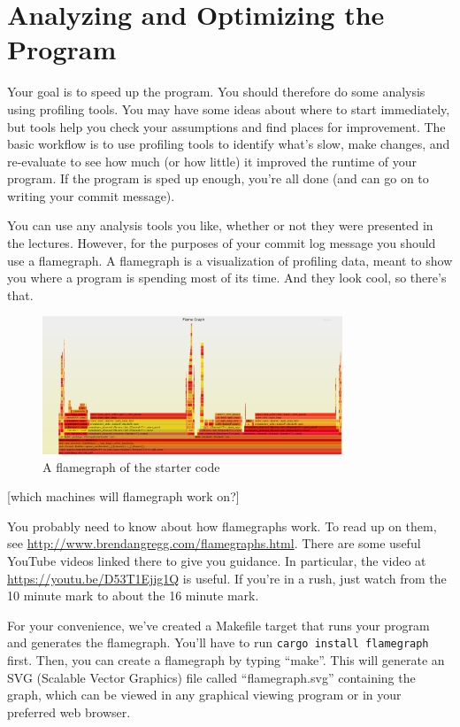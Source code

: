 \section*{Analyzing and Optimizing the Program }
Your goal is to speed up the program. You should therefore do some analysis using profiling tools. You may have some ideas about where to start immediately, but tools help you check your assumptions and find places for improvement. The basic workflow is to use profiling tools to identify what's slow, make changes, and re-evaluate to see how much (or how little) it improved the runtime of your program. If the program is sped up enough, you're all done (and can go on to writing your commit message). 


You can use any analysis tools you like, whether or not they were presented in the lectures. However, for the purposes of your commit log message you should use a flamegraph. A flamegraph is a visualization of profiling data, meant to show you where a program is spending most of its time. And they look cool, so there's that. 

\begin{figure}[h]
	\begin{center}
		\caption{A flamegraph of the starter code}
		\includegraphics[width=0.8\textwidth]{./flamegraph.png}
	\end{center}
\end{figure}


[which machines will flamegraph work on?]

You probably need to know about how flamegraphs work. To read up on them, see \url{http://www.brendangregg.com/flamegraphs.html}. There are some useful YouTube videos linked there to give you guidance. In particular, the video at \url{https://youtu.be/D53T1Ejig1Q} is useful. If you're in a rush, just watch from the 10 minute mark to about the 16 minute mark.

For your convenience, we've created a Makefile target that runs your program and generates the flamegraph. You'll have to run \texttt{cargo install flamegraph} first. Then, you can create a flamegraph by typing ``make''. This will generate an SVG (Scalable Vector Graphics) file called ``flamegraph.svg''  containing the graph, which can be viewed in any graphical viewing program or in your preferred web browser. 

